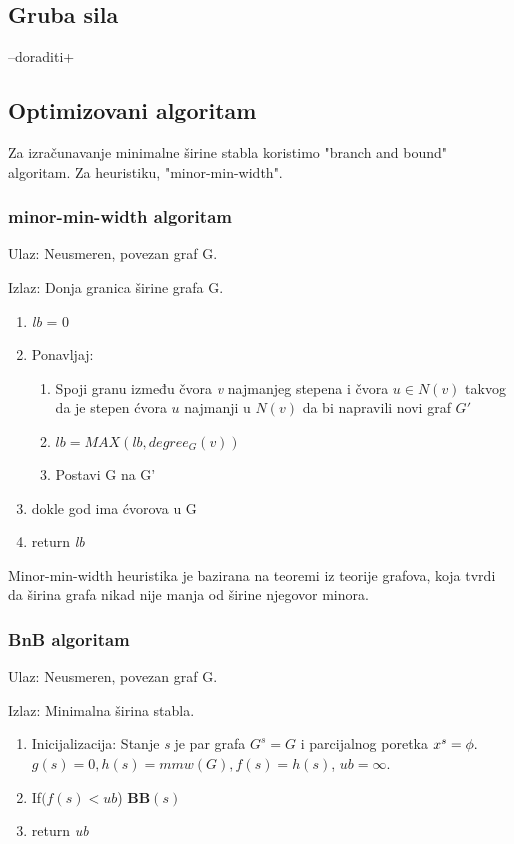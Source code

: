 \documentclass[10pt]{article}
\begin{document}
\subsection{Gruba sila}
--doraditi+
\subsection{Optimizovani algoritam}
Za izračunavanje minimalne širine stabla koristimo "branch and bound" algoritam. Za heuristiku, "minor-min-width".

\subsubsection{minor-min-width algoritam}

Ulaz: Neusmeren, povezan graf G.

Izlaz: Donja granica širine grafa G.

\begin{enumerate}
    \item \textit{lb} = 0
    \item Ponavljaj:
    \begin{enumerate}
    \item Spoji granu između čvora \textit{v} najmanjeg stepena i čvora $u\in N(v)$ takvog da je stepen ćvora $u$ najmanji u $N(v)$ da bi napravili novi graf $G'$
    \item $lb = MAX(lb, degree_G(v))$
    \item Postavi G na G'
    \end{enumerate}
    \item dokle god ima ćvorova u G
    \item return \textit{lb}
\end{enumerate}

Minor-min-width heuristika je bazirana na teoremi iz teorije grafova, koja tvrdi da širina grafa nikad nije manja od širine njegovor minora.
\subsubsection{BnB algoritam}

Ulaz: Neusmeren, povezan graf G.

Izlaz: Minimalna širina stabla.

\begin{enumerate}
    \item Inicijalizacija: Stanje \textit{s} je par grafa $G^s = G$ i parcijalnog poretka $x^s = \phi.\\$$g(s) = 0, h(s) = mmw(G), f(s) = h(s)$, $ub = \infty$.
    \item If$(f(s) < ub$) \textbf{BB}$(s)$
    \item return \textit{ub}
\end{enumerate}
\end{document}
